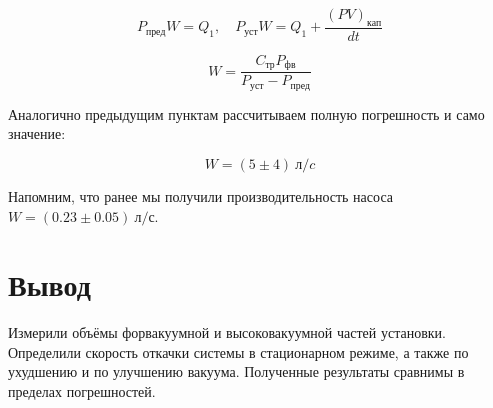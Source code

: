 \documentclass[a4paper, 12pt]{article}
\begin{document}
		    $$P_{пред}W = Q_1, \quad P_{уст}W = Q_1 + \frac{(PV)_{кап}}{dt}$$

            $$W = \frac{C_{тр} P_{фв}}{P_{уст} - P_{пред}}$$

            Аналогично предыдущим пунктам рассчитываем полную погрешность и само значение:

            $$W = (5 \pm 4)~л/c$$

            Напомним, что ранее мы получили производительность насоса $W = (0.23 \pm 0.05)~л/с$.

    \section{Вывод}

        Измерили объёмы форвакуумной и высоковакуумной частей установки. Определили скорость откачки системы в стационарном режиме, а также по ухудшению и по улучшению вакуума. Полученные результаты сравнимы в пределах погрешностей.
\end{document}
